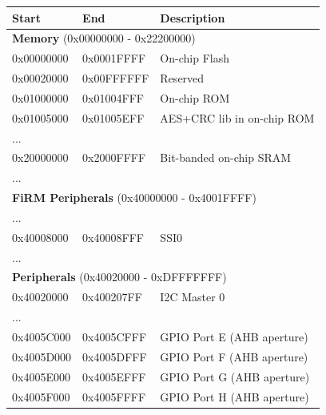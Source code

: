 \begin{center}
	\begin{table}
		\small
		\begin{tabular}{p{1.6cm}  p{1.6cm}  p{4cm}} 
			\hline
			Start & End & Description \\ 
			\hline
			\multicolumn{3}{l}{\textbf{Memory} (0x00000000 - 0x22200000)}  \\
			\hline
			0x00000000 & 0x0001FFFF & On-chip Flash \\ 
			\hline
			0x00020000 & 0x00FFFFFF & Reserved \\
			\hline
			0x01000000 & 0x01004FFF & On-chip ROM  \\
			\hline
			0x01005000 & 0x01005EFF & AES+CRC lib in on-chip ROM   \\
			\hline
			... & & \\
			\hline
			0x20000000 & 0x2000FFFF & Bit-banded on-chip SRAM \\
			\hline
			... & & \\
			\hline
			\multicolumn{3}{l}{\textbf{FiRM Peripherals} (0x40000000 - 0x4001FFFF)}  \\
			\hline
			... & & \\
			\hline
			0x40008000 & 0x40008FFF & SSI0 \\
			\hline
			... & & \\
			\hline
			\multicolumn{3}{l}{\textbf{Peripherals} (0x40020000 - 0xDFFFFFFF)}  \\
			\hline
			0x40020000 & 0x400207FF & I2C Master 0 \\
			\hline
			... & & \\
			\hline
			0x4005C000 & 0x4005CFFF & GPIO Port E (AHB aperture) \\
			\hline
			0x4005D000 & 0x4005DFFF & GPIO Port F (AHB aperture) \\
			\hline
			0x4005E000 & 0x4005EFFF & GPIO Port G (AHB aperture) \\
			\hline
			0x4005F000 & 0x4005FFFF & GPIO Port H (AHB aperture) \\
			\hline

\end{tabular}
\end{table}
\end{center}
